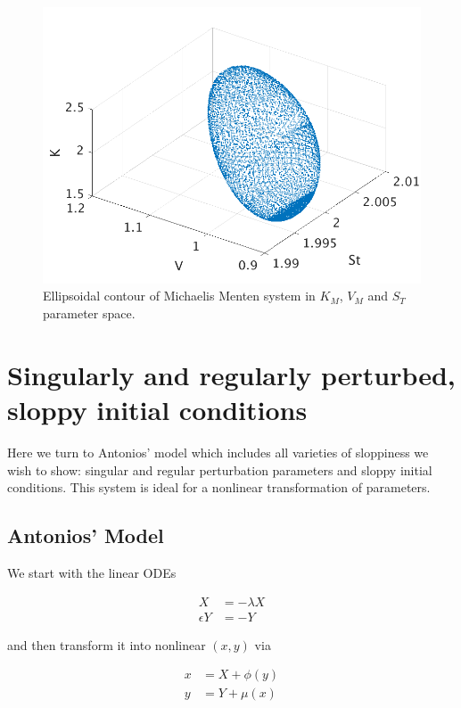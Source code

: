 \documentclass[11pt]{article}
\begin{document}
\begin{figure}[htbp]
  \centering
  \includegraphics[width=\linewidth]{k-v-st-contour}
  \caption{Ellipsoidal contour of Michaelis Menten system in $K_M$, $V_M$ and $S_T$ parameter space.}
\end{figure}

\section{Singularly and regularly perturbed, sloppy initial conditions}

Here we turn to Antonios' model which includes all varieties of sloppiness we wish to show: singular and regular perturbation parameters and sloppy initial conditions. This system is ideal for a nonlinear transformation of parameters.

\subsection{Antonios' Model}

We start with the linear ODEs

\begin{align*}
  X &= -\lambda X \\
  \epsilon Y &= -Y
\end{align*}

and then transform it into nonlinear $(x, y)$ via 

\begin{align*}
  x &= X + \phi(y) \\
  y &= Y + \mu(x) \\
\end{align*}
\end{document}
